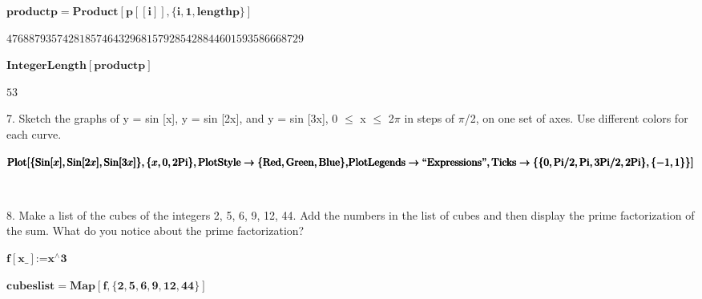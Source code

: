 \documentclass{article}
\begin{document}
\begin{doublespace}
\noindent\(\pmb{\text{productp}=\text{Product}[p[[i]],\{i,1,\text{lengthp}\}]}\)
\end{doublespace}

\begin{doublespace}
\noindent\(47688793574281857464329681579285428844601593586668729\)
\end{doublespace}

\begin{doublespace}
\noindent\(\pmb{\text{IntegerLength}[\text{productp}]}\)
\end{doublespace}

\begin{doublespace}
\noindent\(53\)
\end{doublespace}

7. Sketch the graphs of y = sin [x], y = sin [2x], and y = sin [3x], 0 $\leq $ x $\leq $ 2$\pi $ in steps of $\pi $/2, on one set of axes. Use different
colors for each curve.\\


\begin{doublespace}
\noindent\(\pmb{\text{Plot}[\{\text{Sin}[x],\text{Sin}[2x],\text{Sin}[3x]\},\{x,0,2\text{Pi}\},\text{PlotStyle}\to \{\text{Red},\text{Green},\text{Blue}\},}\\
\pmb{\text{PlotLegends}\to \text{{``}Expressions{''}},\text{Ticks}\to \{\{0,\text{Pi}/2,\text{Pi},3\text{Pi}/2,2\text{Pi}\},\{-1,1\}\}]}\)
\end{doublespace}

\begin{doublespace}
\noindent\(\begin{array}{cc}
  &  \\
\end{array}\)
\end{doublespace}

8. Make a list of the cubes of the integers 2, 5, 6, 9, 12, 44. Add the numbers in the list of cubes and then display the prime factorization of
the sum. What do you notice about the prime factorization? \\


\begin{doublespace}
\noindent\(\pmb{f[\text{x$\_$}]\text{:=}x{}^{\wedge}3}\)
\end{doublespace}

\begin{doublespace}
\noindent\(\pmb{\text{cubeslist}=\text{Map}[f,\{2,5,6,9,12,44\}]}\)
\end{doublespace}
\end{document}
